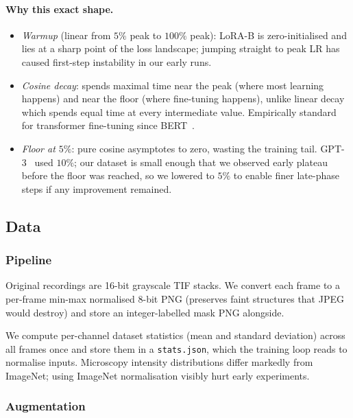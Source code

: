 \documentclass[11pt,a4paper]{article}
\begin{document}
\paragraph{Why this exact shape.}
\begin{itemize}[noitemsep,topsep=3pt]
    \item \textit{Warmup} (linear from $5\%$ peak to $100\%$ peak): LoRA-B
          is zero-initialised and lies at a sharp point of the loss
          landscape; jumping straight to peak LR has caused first-step
          instability in our early runs.
    \item \textit{Cosine decay}: spends maximal time near the peak (where
          most learning happens) and near the floor (where fine-tuning
          happens), unlike linear decay which spends equal time at every
          intermediate value. Empirically standard for transformer
          fine-tuning since BERT~\cite{bert}.
    \item \textit{Floor at $5\%$}: pure cosine asymptotes to zero,
          wasting the training tail. GPT-3~\cite{gpt3} used $10\%$;
          our dataset is small enough that we observed early plateau
          before the floor was reached, so we lowered to $5\%$ to
          enable finer late-phase steps if any improvement remained.
\end{itemize}

\subsection{Data}

\subsubsection{Pipeline}

Original recordings are 16-bit grayscale TIF stacks. We convert each
frame to a per-frame min-max normalised 8-bit PNG (preserves faint
structures that JPEG would destroy) and store an integer-labelled mask
PNG alongside.

We compute per-channel dataset statistics (mean and standard deviation)
across all frames once and store them in a \texttt{stats.json}, which
the training loop reads to normalise inputs. Microscopy intensity
distributions differ markedly from ImageNet; using ImageNet
normalisation visibly hurt early experiments.

\subsubsection{Augmentation}
\end{document}
